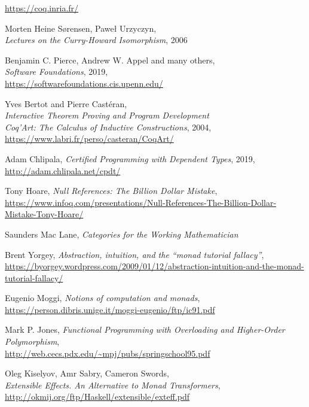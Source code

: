 \documentclass[declaration,inz,english,shortabstract]{iithesis}
\begin{document}
\begin{thebibliography}{1}
        \url{https://coq.inria.fr/}

        Morten Heine Sørensen, Paweł Urzyczyn, \\
        \textit{Lectures on the Curry-Howard Isomorphism}, 2006
    
        Benjamin C. Pierce, Andrew W. Appel and many others, \\
        \textit{Software Foundations}, 2019, \\
        \url{https://softwarefoundations.cis.upenn.edu/}
    
        Yves Bertot and Pierre Castéran, \\
        \textit{Interactive Theorem Proving and Program Development \\ Coq'Art: The Calculus of Inductive Constructions}, 2004, \\
        \url{https://www.labri.fr/perso/casteran/CoqArt/}

        Adam Chlipala,
        \textit{Certified Programming with Dependent Types}, 2019,
        \url{http://adam.chlipala.net/cpdt/}

        Tony Hoare,
        \textit{Null References: The Billion Dollar Mistake}, \\
        \url{https://www.infoq.com/presentations/Null-References-The-Billion-Dollar-Mistake-Tony-Hoare/}
    
        Saunders Mac Lane,
        \textit{Categories for the Working Mathematician}

        Brent Yorgey, \textit{Abstraction, intuition, and the ``monad tutorial fallacy''}, \\
        \url{https://byorgey.wordpress.com/2009/01/12/abstraction-intuition-and-the-monad-tutorial-fallacy/}

        Eugenio Moggi, \textit{Notions of computation and monads}, \\
        \url{https://person.dibris.unige.it/moggi-eugenio/ftp/ic91.pdf}

        Mark P. Jones,
        \textit{Functional Programming with Overloading and Higher-Order Polymorphism}, \\
        \url{http://web.cecs.pdx.edu/~mpj/pubs/springschool95.pdf}

        Oleg Kiselyov, Amr Sabry, Cameron Swords, \\
        \textit{Extensible Effects. An Alternative to Monad Transformers}, \\
        \url{http://okmij.org/ftp/Haskell/extensible/exteff.pdf}


\end{thebibliography}
\end{document}
